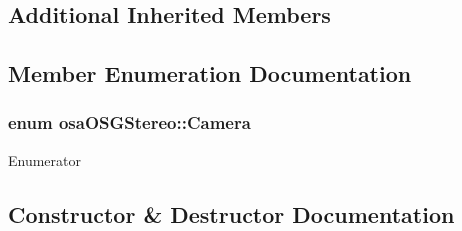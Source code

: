 \subsection*{Additional Inherited Members}


\subsection{Member Enumeration Documentation}
\hypertarget{classosa_o_s_g_stereo_a6f3072fa8cc1d46fcedff6b2d497f396}{}
\subsubsection[{Camera}]{\setlength{\rightskip}{0pt plus 5cm}enum {\bf osa\+O\+S\+G\+Stereo\+::\+Camera}}\label{classosa_o_s_g_stereo_a6f3072fa8cc1d46fcedff6b2d497f396}
\begin{Desc}
\item[Enumerator]\par
\begin{description}
\item[{\em 
\hypertarget{classosa_o_s_g_stereo_a6f3072fa8cc1d46fcedff6b2d497f396a7d425a8f4711074d0aada8186a7fabc4}{}L\+E\+F\+T\label{classosa_o_s_g_stereo_a6f3072fa8cc1d46fcedff6b2d497f396a7d425a8f4711074d0aada8186a7fabc4}
}]\item[{\em 
\hypertarget{classosa_o_s_g_stereo_a6f3072fa8cc1d46fcedff6b2d497f396a26b5df6fc40a2f0e4976129b85e091d1}{}R\+I\+G\+H\+T\label{classosa_o_s_g_stereo_a6f3072fa8cc1d46fcedff6b2d497f396a26b5df6fc40a2f0e4976129b85e091d1}
}]\end{description}
\end{Desc}


\subsection{Constructor \& Destructor Documentation}
\hypertarget{classosa_o_s_g_stereo_a679f7f90565f4666470a5c5204519139}{}
